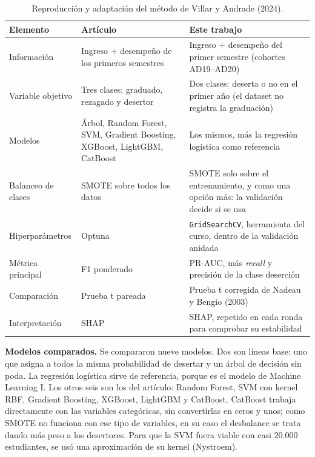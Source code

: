 \documentclass[11pt,a4paper]{article}
\begin{document}
\begin{table}[H]
\centering
\footnotesize
\caption{Reproducción y adaptación del método de Villar y Andrade (2024).}
\label{tab:adaptacion}
\begin{tabular}{>{\raggedright\arraybackslash}p{2.5cm}>{\raggedright\arraybackslash}p{4.6cm}>{\raggedright\arraybackslash}p{7.1cm}}
\toprule
Elemento & Artículo & Este trabajo \\
\midrule
Información & Ingreso + desempeño de los primeros semestres & Ingreso + desempeño del primer semestre (cohortes AD19--AD20) \\
Variable objetivo & Tres clases: graduado, rezagado y desertor & Dos clases: deserta o no en el primer año (el dataset no registra la graduación) \\
Modelos & Árbol, Random Forest, SVM, Gradient Boosting, XGBoost, LightGBM, CatBoost & Los mismos, más la regresión logística como referencia \\
Balanceo de clases & SMOTE sobre todos los datos & SMOTE solo sobre el entrenamiento, y como una opción más: la validación decide si se usa \\
Hiperparámetros & Optuna & \texttt{GridSearchCV}, herramienta del curso, dentro de la validación anidada \\
Métrica principal & F1 ponderado & PR-AUC, más \textit{recall} y precisión de la clase deserción \\
Comparación & Prueba t pareada & Prueba t corregida de Nadeau y Bengio (2003) \\
Interpretación & SHAP & SHAP, repetido en cada ronda para comprobar su estabilidad \\
\bottomrule
\end{tabular}
\end{table}

\textbf{Modelos comparados.} Se compararon nueve modelos. Dos son líneas base: uno que asigna a todos la misma probabilidad de desertar y un árbol de decisión sin poda. La regresión logística sirve de referencia, porque es el modelo de Machine Learning I. Los otros seis son los del artículo: Random Forest, SVM con kernel RBF, Gradient Boosting, XGBoost, LightGBM y CatBoost. CatBoost trabaja directamente con las variables categóricas, sin convertirlas en ceros y unos; como SMOTE no funciona con ese tipo de variables, en su caso el desbalance se trata dando más peso a los desertores. Para que la SVM fuera viable con casi 20.000 estudiantes, se usó una aproximación de su kernel (Nystroem).
\end{document}
